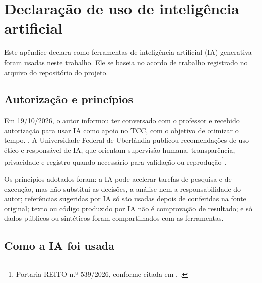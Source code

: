 \chapter{Declaração de uso de inteligência artificial}
\label{ap:uso-de-ia}

Este apêndice declara como ferramentas de inteligência artificial (IA) generativa foram usadas neste trabalho. Ele se baseia no acordo de trabalho registrado no arquivo  do repositório do projeto.

\section{Autorização e princípios}

Em 19/10/2026, o autor informou ter conversado com o professor e recebido autorização para usar IA como apoio no TCC, com o objetivo de otimizar o tempo. . A Universidade Federal de Uberlândia publicou recomendações de uso ético e responsável de IA, que orientam supervisão humana, transparência, privacidade e registro quando necessário para validação ou reprodução\footnote{Portaria REITO n.º 539/2026, conforme citada em . .}.

Os princípios adotados foram: a IA pode acelerar tarefas de pesquisa e de execução, mas não substitui as decisões, a análise nem a responsabilidade do autor; referências sugeridas por IA só são usadas depois de conferidas na fonte original; texto ou código produzido por IA não é comprovação de resultado; e só dados públicos ou sintéticos foram compartilhados com as ferramentas.

\section{Como a IA foi usada}

